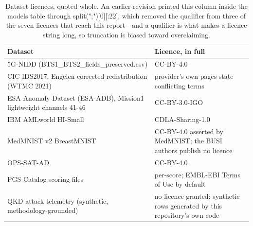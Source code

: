 \begin{table}[htbp]\centering\small
\caption{Dataset licences, quoted whole. An earlier revision printed this column inside the models table through split(";")[0][:22], which removed the qualifier from three of the seven licences that reach this report - and a qualifier is what makes a licence string long, so truncation is biased toward overclaiming.}
\begin{tabular}{>{\raggedright\arraybackslash}p{4.2cm}>{\raggedright\arraybackslash}p{9.5cm}}
\toprule
\textbf{Dataset} & \textbf{Licence, in full} \\
\midrule
5G-NIDD (BTS1\_\allowbreak{}BTS2\_\allowbreak{}fields\_\allowbreak{}preserved.csv) & CC-BY-4.0 \\
CIC-IDS2017, Engelen-corrected redistribution (WTMC 2021) & provider's own pages state conflicting terms \\
ESA Anomaly Dataset (ESA-ADB), Mission1 lightweight channels 41-46 & CC-BY-3.0-IGO \\
IBM AMLworld HI-Small & CDLA-Sharing-1.0 \\
MedMNIST v2 BreastMNIST & CC-BY-4.0 asserted by MedMNIST; the BUSI authors publish no licence \\
OPS-SAT-AD & CC-BY-4.0 \\
PGS Catalog scoring files & per-score; EMBL-EBI Terms of Use by default \\
QKD attack telemetry (synthetic, methodology-grounded) & no licence granted; synthetic rows generated by this repository's own code \\
\bottomrule
\end{tabular}
\end{table}
